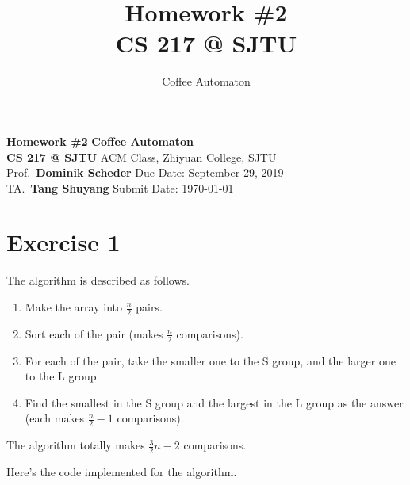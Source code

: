 \documentclass[
]{article}
\title{
  \vspace{2in}
  \textmd{\textbf{Homework \#2}}
  \normalsize\vspace{0.1in}\\
  \textmd{\textbf{CS 217 @ SJTU}}
  \normalsize\vspace{0.1in}\\
}
\author{Coffee Automaton}
\date{}
\begin{document}
\noindent
\large\textbf{Homework \#2}
\hfill
\textbf{Coffee Automaton} \\
\normalsize {\bf CS 217 @ SJTU} \hfill ACM Class, Zhiyuan College, SJTU\\
Prof.~{\bf Dominik Scheder} \hfill Due Date: September 29, 2019\\
  TA.~{\bf Tang Shuyang}
\hfill Submit Date: \today


\hypertarget{exercise-1}{%
\section{Exercise 1}\label{exercise-1}}

The algorithm is described as follows.

\begin{enumerate}
\def\labelenumi{\arabic{enumi}.}
\item
  Make the array into \(\frac{n}{2}\) pairs.
\item
  Sort each of the pair (makes \(\frac{n}{2}\) comparisons).
\item
  For each of the pair, take the smaller one to the S group, and the
  larger one to the L group.
\item
  Find the smallest in the S group and the largest in the L group as the
  answer (each makes \(\frac{n}{2}-1\) comparisons).
\end{enumerate}

The algorithm totally makes \(\frac{3}{2}n-2\) comparisons.

Here's the code implemented for the algorithm.
\end{document}

